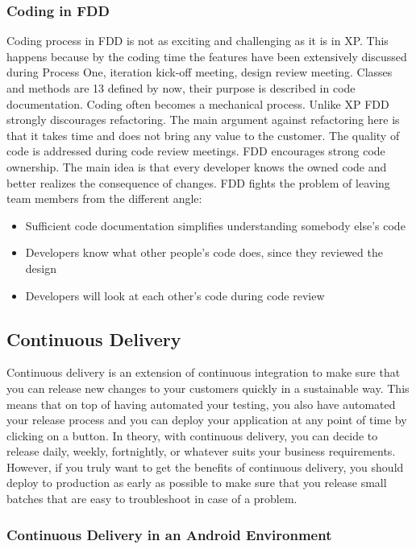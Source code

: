 \subsubsection{Coding in FDD}
Coding process in FDD is not as exciting and challenging as it is in XP. This happens because by the coding time the features have been extensively discussed during Process One, iteration kick-off meeting, design review meeting. Classes and methods are 13 defined by now, their purpose is described in code documentation. Coding often becomes a mechanical process. Unlike XP FDD strongly discourages refactoring. The main argument against refactoring here is that it takes time and does not bring any value to the customer. The quality of code is addressed during code review meetings. FDD encourages strong code ownership. The main idea is that every developer knows the owned code and better realizes the consequence of changes.\cite{FDD_paper1} 
FDD fights the problem of leaving team members from the different angle:
\begin{itemize}
    \item Sufficient code documentation simplifies understanding somebody else’s code
    \item Developers know what other people’s code does, since they reviewed the design
    \item Developers will look at each other’s code during code review
\end{itemize}

\subsection{Continuous Delivery}
Continuous delivery is an extension of continuous integration to make sure that you can release new changes to your customers quickly in a sustainable way. This means that on top of having automated your testing, you also have automated your release process and you can deploy your application at any point of time by clicking on a button.
In theory, with continuous delivery, you can decide to release daily, weekly, fortnightly, or whatever suits your business requirements. However, if you truly want to get the benefits of continuous delivery, you should deploy to production as early as possible to make sure that you release small batches that are easy to troubleshoot in case of a problem. \cite{Cont_delivery_2}

\subsubsection{Continuous Delivery in an Android Environment}

